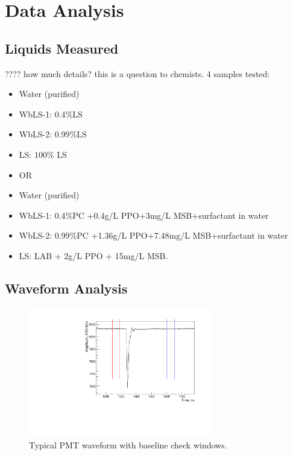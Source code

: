 \documentclass[preprint,12pt]{elsarticle}
\begin{document}
 \section{Data Analysis}
 \label{dataanalysissectiontop}


\subsection{Liquids Measured}
\label{liquidsmeasuredsection}
???? how much details? this is a question to chemists.
4 samples tested:
\begin{itemize}

 \item{Water (purified)}
 \item{WbLS-1: 0.4$\%$LS}
 \item{WbLS-2: 0.99$\%$LS}
 \item{LS: 100$\%$ LS}
\item{OR}

\item{Water (purified)}
 \item{WbLS-1: 0.4$\%$PC +0.4g/L PPO+3mg/L MSB+surfactant in water}
 \item{WbLS-2: 0.99$\%$PC +1.36g/L PPO+7.48mg/L MSB+surfactant in water}
 \item{LS: LAB + 2g/L PPO + 15mg/L MSB.}
\end{itemize}


\subsection{Waveform Analysis}
\label{waveformanalysis}


\begin{figure}[ht]
\centering
\includegraphics[width=80mm]{PMTtypicalSignal.pdf}
\caption{Typical PMT waveform with baseline check windows.} \label{typicalpmtsignal}
\end{figure}
\end{document}

